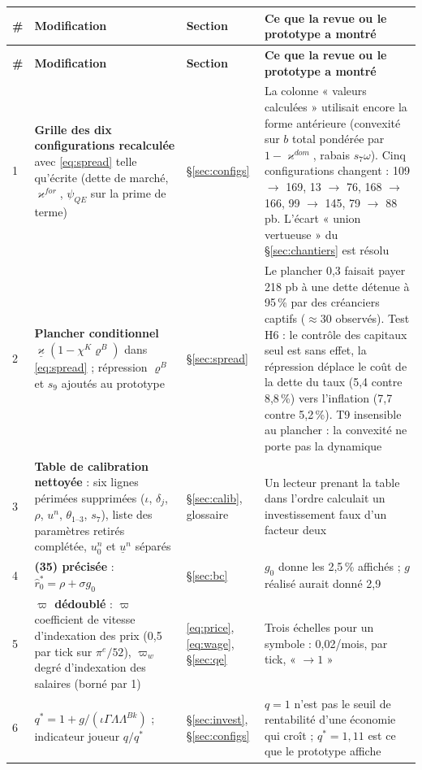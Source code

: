 \documentclass[11pt,a4paper]{article}
\begin{document}
\begin{center}\small
\begin{longtable}{p{0.5cm}p{6.6cm}p{2.1cm}p{5.8cm}}
\toprule
\textbf{\#} & \textbf{Modification} & \textbf{Section} & \textbf{Ce que la revue ou le prototype a montré}\\
\midrule
\endfirsthead
\toprule
\textbf{\#} & \textbf{Modification} & \textbf{Section} & \textbf{Ce que la revue ou le prototype a montré}\\
\midrule
\endhead
1 & \textbf{Grille des dix configurations recalculée} avec \eqref{eq:spread} telle qu'écrite (dette de marché, $\varkappa^{for}$, $\psi_{QE}$ sur la prime de terme) & \S\ref{sec:configs} & La colonne « valeurs calculées » utilisait encore la forme antérieure (convexité sur $b$ total pondérée par $1-\varkappa^{dom}$, rabais $s_7\omega$). Cinq configurations changent : 109 $\to$ 169, 13 $\to$ 76, 168 $\to$ 166, 99 $\to$ 145, 79 $\to$ 88 pb. L'écart « union vertueuse » du \S\ref{sec:chantiers} est résolu\\
2 & \textbf{Plancher conditionnel} $\underline\varkappa(1-\chi^K\varrho^B)$ dans \eqref{eq:spread} ; répression $\varrho^B$ et $s_9$ ajoutés au prototype & \S\ref{sec:spread} & Le plancher 0,3 faisait payer 218 pb à une dette détenue à 95\,\% par des créanciers captifs ($\approx30$ observés). Test H6 : le contrôle des capitaux seul est sans effet, la répression déplace le coût de la dette du taux (5,4 contre 8,8\,\%) vers l'inflation (7,7 contre 5,2\,\%). T9 insensible au plancher : la convexité ne porte pas la dynamique\\
3 & \textbf{Table de calibration nettoyée} : six lignes périmées supprimées ($\iota$, $\delta_j$, $\rho$, $u^n$, $\theta_{1\text{--}3}$, $s_7$), liste des paramètres retirés complétée, $u^n_0$ et $\underline u^n$ séparés & \S\ref{sec:calib}, glossaire & Un lecteur prenant la table dans l'ordre calculait un investissement faux d'un facteur deux\\
4 & \textbf{(35) précisée} : $\hat r^\ast_0=\rho+\sigma g_0$ & \S\ref{sec:bc} & $g_0$ donne les 2,5\,\% affichés ; $g$ réalisé aurait donné 2,9\\
5 & \textbf{$\varpi$ dédoublé} : $\varpi$ coefficient de vitesse d'indexation des prix (0,5 par tick sur $\pi^e/52$), $\varpi_w$ degré d'indexation des salaires (borné par 1) & \eqref{eq:price}, \eqref{eq:wage}, \S\ref{sec:qe} & Trois échelles pour un symbole : 0,02/mois, par tick, « $\to1$ »\\
6 & \textbf{$q^\ast=1+g/(\iota\Gamma\Lambda\Lambda^{Bk})$} ; indicateur joueur $q/q^\ast$ & \S\ref{sec:invest}, \S\ref{sec:configs} & $q=1$ n'est pas le seuil de rentabilité d'une économie qui croît ; $q^\ast=1{,}11$ est ce que le prototype affiche\\

\end{longtable}
\end{center}
\end{document}
